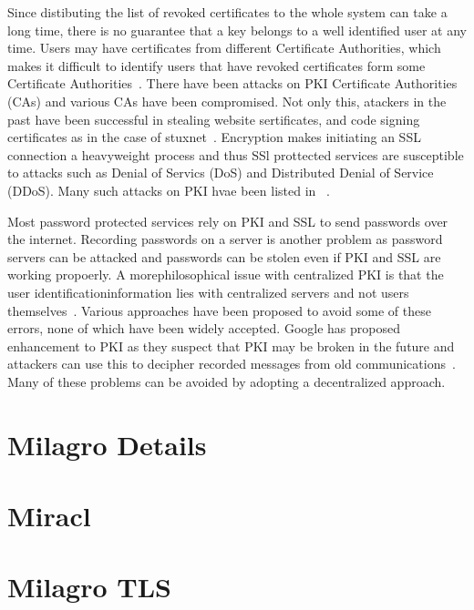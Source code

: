 Since distibuting the list of revoked certificates to the whole system
can take a long time, there is no guarantee that a key belongs to a
well identified user at any time. Users may have certificates from
different Certificate Authorities, which makes it difficult to
identify users that have revoked certificates form some Certificate
Authorities~\cite{distlab-pki-problems}.  There have been attacks on
PKI Certificate Authorities (CAs) and various CAs have been
compromised. Not only this, atackers in the past have been successful
in stealing website sertificates, and code signing certificates as in
the case of stuxnet~\cite{securityweek-ssl-threats}. Encryption makes
initiating an SSL connection a heavyweight process and thus SSl
prottected services are susceptible to attacks such as Denial of
Servics (DoS) and Distributed Denial of Service (DDoS). Many such
attacks on PKI hvae been listed in ~\cite{cacert-wiki-pki-history}.

Most password protected services rely on PKI and SSL to send passwords
over the internet. Recording passwords on a server is another problem
as password servers can be attacked and passwords can be stolen even
if PKI and SSL are working propoerly. A morephilosophical issue with
centralized PKI is that the user identificationinformation lies with
centralized servers and not users
themselves~\cite{distlab-pki-poblems}.  Various approaches have been
proposed to avoid some of these errors, none of which have been widely
accepted. Google has proposed enhancement to PKI as they suspect that
PKI may be broken in the future and attackers can use this to decipher
recorded messages from old
communications~\cite{securityweek-ssl-threats}.  Many of these
problems can be avoided by adopting a decentralized approach.


\section{Milagro Details}

\section{Miracl}

\section{Milagro TLS}


